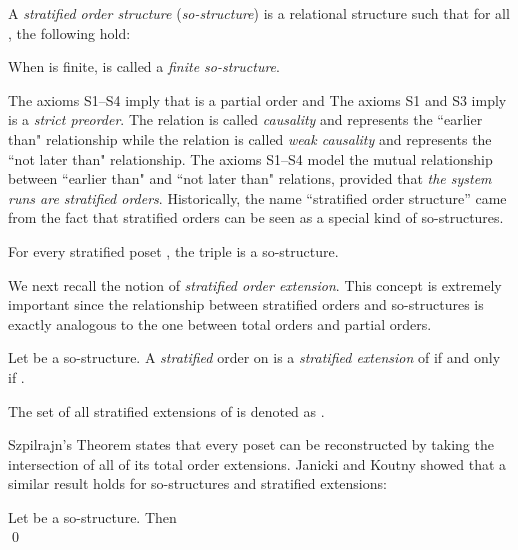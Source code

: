 \documentclass{llncs}
\begin{document}
\begin{definition}
A \emph{stratified order structure} (\emph{so-structure}) is a relational structure  such that for all , the following hold:

When  is finite,  is called a \emph{finite so-structure}. \EOD
\label{def:sos}
\end{definition}


The axioms \textsf{S1}--\textsf{S4} imply that  is a partial order and   The axioms \textsf{S1} and \textsf{S3} imply  is a \emph{strict preorder}. The relation  is called \textit{causality} and represents the ``earlier than" relationship while the relation  is called \textit{weak causality} and represents the ``not later than" relationship. The axioms \textsf{S1}--\textsf{S4} model the mutual relationship between ``earlier than" and ``not later than" relations, provided that {\em the system runs are stratified orders}.  Historically, the name ``stratified order structure'' came from the fact that stratified orders can be seen as a special kind of so-structures.



\begin{proposition}[\cite{J4}]
For every stratified poset , the triple  is a so-structure.\END
\label{prop:soss}
\end{proposition}

We next recall the notion of \emph{stratified order extension}. This concept is extremely important  since the relationship between stratified orders and so-structures is exactly analogous to the one between total orders and partial orders.

\begin{definition}
Let  be a so-structure. A {\em stratified} order  on  is a {\em stratified extension} of  if and only if . 

The set of all stratified extensions of   is denoted as  . \EOD
\label{def:extsos}
\end{definition}

Szpilrajn's Theorem \cite{Szp} states that every poset can be reconstructed by taking the intersection of all of its total order extensions. Janicki and Koutny showed that a similar result holds for so-structures and stratified extensions:

\begin{theorem}[{\cite{JK97}}]
Let  be a so-structure. Then\\
\mbox{\hspace{3.5cm}} 
\qed
\label{theo:SzpStrat}
\end{theorem}
\end{document}
